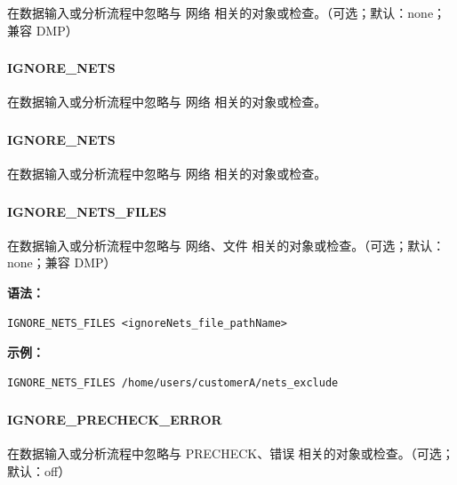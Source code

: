 在数据输入或分析流程中忽略与 网络 相关的对象或检查。（可选；默认：none；兼容 DMP）

\subsubsection{}
\paragraph*{IGNORE_NETS}

在数据输入或分析流程中忽略与 网络 相关的对象或检查。

\subsubsection{}
\paragraph*{IGNORE_NETS}

在数据输入或分析流程中忽略与 网络 相关的对象或检查。

\subsubsection{}
\paragraph*{IGNORE_NETS_FILES}

在数据输入或分析流程中忽略与 网络、文件 相关的对象或检查。（可选；默认：none；兼容 DMP）

\textbf{语法：}
\begin{lstlisting}
IGNORE_NETS_FILES <ignoreNets_file_pathName>
\end{lstlisting}

\textbf{示例：}
\begin{lstlisting}
IGNORE_NETS_FILES /home/users/customerA/nets_exclude
\end{lstlisting}

\subsubsection{}
\paragraph*{IGNORE_PRECHECK_ERROR}

在数据输入或分析流程中忽略与 PRECHECK、错误 相关的对象或检查。（可选；默认：off）

